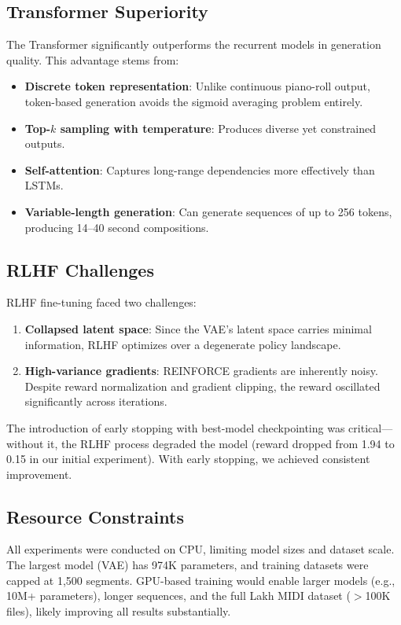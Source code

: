 \documentclass[conference]{IEEEtran}
\begin{document}
\subsection{Transformer Superiority}

The Transformer significantly outperforms the recurrent models in generation quality. This advantage stems from:
\begin{itemize}
    \item \textbf{Discrete token representation}: Unlike continuous piano-roll output, token-based generation avoids the sigmoid averaging problem entirely.
    \item \textbf{Top-$k$ sampling with temperature}: Produces diverse yet constrained outputs.
    \item \textbf{Self-attention}: Captures long-range dependencies more effectively than LSTMs.
    \item \textbf{Variable-length generation}: Can generate sequences of up to 256 tokens, producing 14--40 second compositions.
\end{itemize}

\subsection{RLHF Challenges}

RLHF fine-tuning faced two challenges:
\begin{enumerate}
    \item \textbf{Collapsed latent space}: Since the VAE's latent space carries minimal information, RLHF optimizes over a degenerate policy landscape.
    \item \textbf{High-variance gradients}: REINFORCE gradients are inherently noisy. Despite reward normalization and gradient clipping, the reward oscillated significantly across iterations.
\end{enumerate}

The introduction of early stopping with best-model checkpointing was critical---without it, the RLHF process degraded the model (reward dropped from 1.94 to 0.15 in our initial experiment). With early stopping, we achieved consistent improvement.

\subsection{Resource Constraints}

All experiments were conducted on CPU, limiting model sizes and dataset scale. The largest model (VAE) has 974K parameters, and training datasets were capped at 1,500 segments. GPU-based training would enable larger models (e.g., 10M+ parameters), longer sequences, and the full Lakh MIDI dataset ($>$100K files), likely improving all results substantially.
\end{document}

